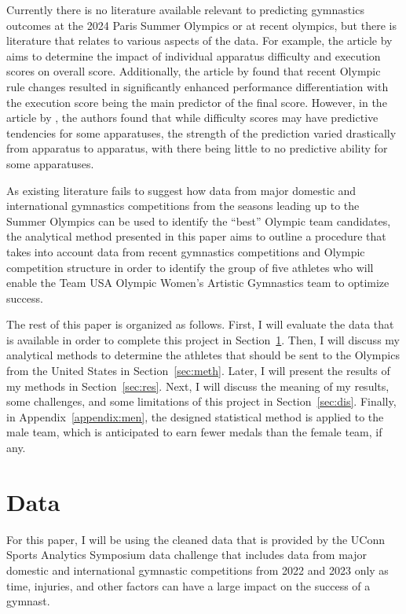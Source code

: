 \documentclass[12pt]{article}
\begin{document}
Currently there is no literature available relevant to predicting gymnastics outcomes at the 2024 
Paris Summer Olympics or at recent olympics, but there is literature that relates to various aspects of 
the data. For example, the article by \citet{ScienceOfGymnastics2021} aims to determine the 
impact of individual apparatus difficulty and execution scores on overall score. 
 Additionally, the article by \citet{JonasRohleder2023} 
found that recent Olympic rule changes resulted in significantly enhanced performance 
differentiation with the execution score being the main predictor of the final score. 
However, in the article by \citet{ApparatusDifficulty2010}, the authors found that while difficulty scores may 
have predictive tendencies for some apparatuses, 
the strength of the prediction varied drastically from apparatus to apparatus, with there being little to no 
predictive ability for some apparatuses. 


As existing literature fails to suggest how data from major domestic and international gymnastics competitions 
from the seasons leading up to the Summer Olympics can be used to identify the ``best'' Olympic team candidates, 
the analytical method presented in this paper aims to outline a procedure that takes into account data from recent 
gymnastics competitions and Olympic competition structure in order to identify the group of five athletes who will 
enable the Team USA Olympic Women’s Artistic Gymnastics team to optimize success. 

The rest of this paper is organized as follows. First, I will evaluate the data that is available in order to complete 
this project in Section~\ref{sec:data}. Then, I will discuss my 
analytical methods to determine the athletes that should be sent to the Olympics from the United States 
in Section~\ref{sec:meth}. Later, I will present the results of my 
methods in Section~\ref{sec:res}. Next, I will discuss the meaning of my results, some challenges, 
and some limitations of this project in Section~\ref{sec:dis}. Finally, in  Appendix~\ref{appendix:men}, the designed statistical 
method is applied to the male team, which is anticipated to earn fewer medals than the female team, if any.


\section{Data}
\label{sec:data}

For this paper, 
I will be using the cleaned data that is provided by the UConn Sports Analytics Symposium data challenge 
that includes data from major domestic and international gymnastic competitions from 2022 and 2023 only as time, injuries, 
and other factors can have a large impact on the success of a gymnast.
\end{document}
